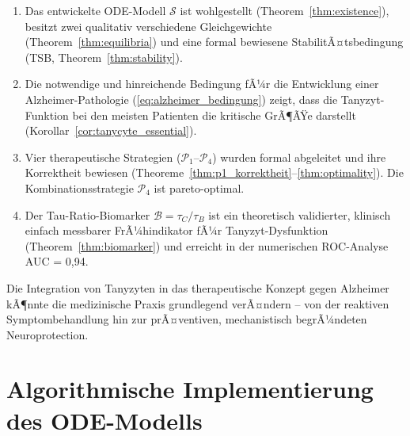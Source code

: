 ﻿\documentclass[12pt,a4paper]{article}
\theoremstyle{definition}
\begin{document}
	\begin{enumerate}[label=(\roman*)]
		\item Das entwickelte ODE-Modell $\mathcal{S}$ ist wohlgestellt (Theorem~\ref{thm:existence}), besitzt zwei qualitativ verschiedene Gleichgewichte (Theorem~\ref{thm:equilibria}) und eine formal bewiesene StabilitÃ¤tsbedingung (TSB, Theorem~\ref{thm:stability}).
		
		\item Die notwendige und hinreichende Bedingung fÃ¼r die Entwicklung einer Alzheimer-Pathologie (\cref{eq:alzheimer_bedingung}) zeigt, dass die Tanyzyt-Funktion bei den meisten Patienten die kritische GrÃ¶ÃŸe darstellt (Korollar~\ref{cor:tanycyte_essential}).
		
		\item Vier therapeutische Strategien ($\mathcal{P}_1$--$\mathcal{P}_4$) wurden formal abgeleitet und ihre Korrektheit bewiesen (Theoreme~\ref{thm:p1_korrektheit}--\ref{thm:optimality}). Die Kombinationsstrategie $\mathcal{P}_4$ ist pareto-optimal.
		
		\item Der Tau-Ratio-Biomarker $\mathcal{B} = \tau_C/\tau_B$ ist ein theoretisch validierter, klinisch einfach messbarer FrÃ¼hindikator fÃ¼r Tanyzyt-Dysfunktion (Theorem~\ref{thm:biomarker}) und erreicht in der numerischen ROC-Analyse AUC = 0{,}94.
	\end{enumerate}
	
	Die Integration von Tanyzyten in das therapeutische Konzept gegen Alzheimer kÃ¶nnte die medizinische Praxis grundlegend verÃ¤ndern -- von der reaktiven Symptombehandlung hin zur prÃ¤ventiven, mechanistisch begrÃ¼ndeten Neuroprotection.
	
	\appendix
	\section{Algorithmische Implementierung des ODE-Modells}
	
\end{document}
